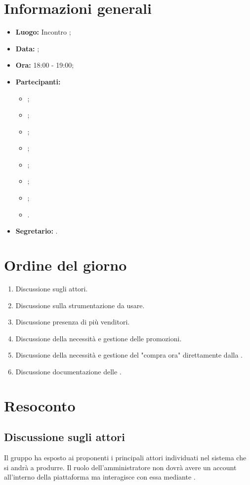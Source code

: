 \section{Informazioni generali}
\begin{itemize}
\item \textbf{Luogo:} Incontro ;
\item \textbf{Data:} \Data;
\item \textbf{Ora:} 18:00 - 19:00;
\item \textbf{Partecipanti:}
	\begin{itemize}
		\item \BL{}; 
		\item \FF{};
		\item \MM{};
		\item \PC{};
		\item \TG{};
		\item \TL{};
		\item \VD{};
		\item \Proponente.
	\end{itemize}
\item \textbf{Segretario:} \PC{}.
\end{itemize}

\section{Ordine del giorno}
\begin{enumerate}
	\item Discussione sugli attori.
	\item Discussione sulla strumentazione da usare.
	\item Discussione presenza di più venditori.
	\item Discussione della necessità e gestione delle promozioni.
	\item Discussione della necessità e gestione del "compra ora" direttamente dalla .
	\item Discussione documentazione delle .
\end{enumerate}

\section{Resoconto}
\subsection{Discussione sugli attori}
Il gruppo ha esposto ai proponenti i principali attori individuati nel sistema che si andrà a produrre. Il ruolo dell'amministratore non dovrà avere un account all'interno della piattaforma ma interagisce con essa mediante .
